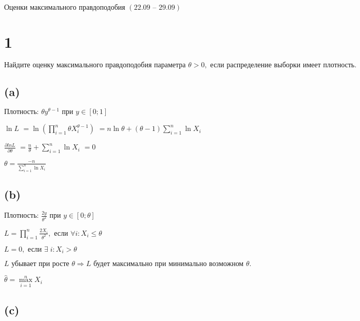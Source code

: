\documentclass[13pt,a4paper]{scrartcl}
\def\suml{\sum\limits}
\def\prodl{\mul\limits}
\def\A{\forall}
\def\E{\exists\;}
\begin{document}
\def\th{\theta}
\def\prodl{\prod\limits}
\def\dd#1#2{\frac{\partial{#1}}{\partial{#2}}}
\def\maxl{\max\limits}

\(\text{Оценки }\allowbreak \text{максимального }\allowbreak \text{правдоподобия }\allowbreak (22.09\text{ -- }29.09)\)

\section*{ 1}

\(\text{Найдите }\allowbreak \text{оценку }\allowbreak \text{максимального }\allowbreak \text{правдоподобия }\allowbreak \text{параметра }\allowbreak \th > 0,\text{ если }\allowbreak \text{распределение }\allowbreak \text{выборки }\allowbreak \text{имеет }\allowbreak \text{плотность.}\allowbreak \)

\subsection*{ (a)}

\(\text{Плотность: }\allowbreak \th y^{\th - 1}\text{ при }\allowbreak y \in [0; 1]\)

\(\ln L\)
\(= \ln(\prodl_{i = 1}^{n} \th X_i^{\th - 1})\)
\(= n \ln \th + (\th - 1) \suml_{i = 1}^{n} \ln X_i\)

\(\dd{ln L}{\th}\)
\(= \frac{n }{\th} + \suml_{i = 1}^{n} \ln X_i\)
\(= 0\)

\(\th = \frac{-n }{\suml_{i = 1}^{n} \ln X_i}\)

\subsection*{ (b)}

\(\text{Плотность: }\allowbreak \frac{2y }{\th^2}\text{ при }\allowbreak y \in [0; \th]\)

\(L = \prodl_{i = 1}^{n} \frac{2 X_i }{\th^2},\text{ если }\allowbreak \A i: X_i \le  \th\)

\(L = 0,\text{ если }\allowbreak \E i: X_i > \th\)

\(L\text{ убывает }\allowbreak \text{при }\allowbreak \text{росте }\allowbreak \th \Rightarrow  L\text{ будет }\allowbreak \text{максимально }\allowbreak \text{при }\allowbreak \text{минимально }\allowbreak \text{возможном }\allowbreak \th.\)

\(\hat\th = \maxl_{i = 1}^{n} X_i\)

\subsection*{ (c)}
\end{document}
